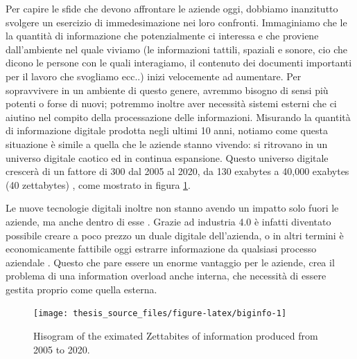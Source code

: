 \documentclass[]{book}
\begin{document}
Per capire le sfide che devono affrontare le aziende oggi, dobbiamo
inanzitutto svolgere un esercizio di immedesimazione nei loro confronti.
Immaginiamo che le la quantità di informazione che potenzialmente ci
interessa e che proviene dall'ambiente nel quale viviamo (le
informazioni tattili, spaziali e sonore, cio che dicono le persone con
le quali interagiamo, il contenuto dei documenti importanti per il
lavoro che svogliamo ecc..) inizi velocemente ad aumentare. Per
sopravvivere in un ambiente di questo genere, avremmo bisogno di sensi
più potenti o forse di nuovi; potremmo inoltre aver necessità sistemi
esterni che ci aiutino nel compito della processazione delle
informazioni. Misurando la quantità di informazione digitale prodotta
negli ultimi 10 anni, notiamo come questa situazione è simile a quella
che le aziende stanno vivendo: si ritrovano in un universo digitale
caotico ed in continua espansione. Questo universo digitale crescerà di
un fattore di 300 dal 2005 al 2020, da 130 exabytes a 40,000 exabytes
(40 zettabytes) \citep{gantz2012digital}, come mostrato in figura
\ref{fig:biginfo}.

Le nuove tecnologie digitali inoltre non stanno avendo un impatto solo
fuori le aziende, ma anche dentro di esse
\citep[\citet{brettel2014virtualization},
\citet{russmann2015industry}]{lasi2014industry}. Grazie ad industria 4.0
è infatti diventato possibile creare a poco prezzo un duale digitale
dell'azienda, o in altri termini è economicamente fattibile oggi
estrarre informazione da qualsiasi processo aziendale
\citep{davies2015industry}. Questo che pare essere un enorme vantaggio
per le aziende, crea il problema di una information overload anche
interna, che necessità di essere gestita proprio come quella esterna.

\begin{figure}

{\centering \texttt{[image: thesis\_source\_files/figure-latex/biginfo-1]} 

}

\caption{Hisogram of the eximated Zettabites of information produced from 2005 to 2020.}\label{fig:biginfo}
\end{figure}
\end{document}
